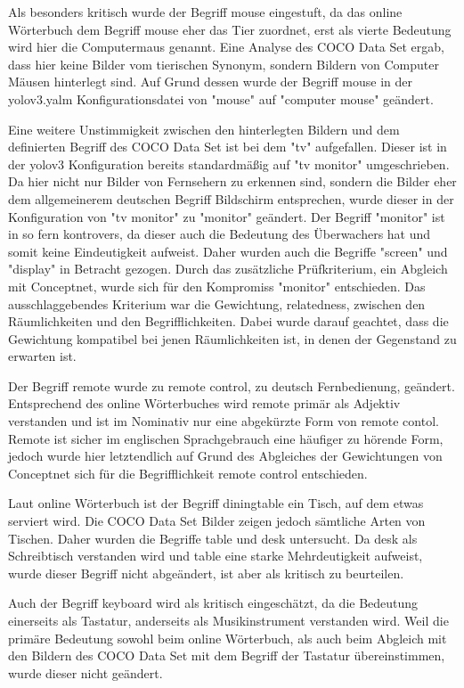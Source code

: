 Als besonders kritisch wurde der Begriff mouse eingestuft, da das online Wörterbuch dem Begriff mouse eher das Tier zuordnet, erst als vierte Bedeutung wird hier die Computermaus genannt.
Eine Analyse des COCO Data Set ergab, dass hier keine Bilder vom tierischen Synonym, sondern Bildern von Computer Mäusen hinterlegt sind.
Auf Grund dessen wurde der Begriff mouse in der yolov3.yalm Konfigurationsdatei von "mouse" auf "computer mouse" geändert. 


Eine weitere Unstimmigkeit zwischen den hinterlegten Bildern und dem definierten Begriff des COCO Data Set ist bei dem  "tv" aufgefallen. Dieser ist in der yolov3 Konfiguration bereits standardmäßig auf "tv monitor" umgeschrieben. Da hier nicht nur Bilder von Fernsehern zu erkennen sind, sondern die Bilder eher dem allgemeinerem deutschen Begriff Bildschirm entsprechen, wurde dieser in der Konfiguration von "tv monitor" zu "monitor" geändert. Der Begriff "monitor" ist in so fern kontrovers, da dieser auch die Bedeutung des Überwachers hat und somit keine Eindeutigkeit aufweist. Daher wurden auch die Begriffe "screen" und "display" in Betracht gezogen. Durch das zusätzliche Prüfkriterium, ein Abgleich mit Conceptnet, wurde sich für den Kompromiss "monitor" entschieden. Das ausschlaggebendes Kriterium war die Gewichtung, relatedness, zwischen den Räumlichkeiten und den Begrifflichkeiten. Dabei wurde darauf geachtet, dass die Gewichtung kompatibel bei jenen Räumlichkeiten ist, in denen der Gegenstand zu erwarten ist. 

Der Begriff remote wurde zu remote control, zu deutsch Fernbedienung, geändert. Entsprechend des online Wörterbuches wird remote primär als Adjektiv verstanden und ist im Nominativ nur eine abgekürzte Form von remote contol. Remote ist sicher im englischen Sprachgebrauch eine häufiger zu hörende Form, jedoch wurde hier letztendlich auf Grund des Abgleiches der Gewichtungen von Conceptnet sich für die Begrifflichkeit remote control entschieden.

Laut online Wörterbuch ist der Begriff diningtable ein Tisch, auf dem etwas serviert wird. Die COCO Data Set Bilder zeigen jedoch sämtliche Arten von Tischen. Daher wurden die Begriffe table und desk untersucht. Da desk als Schreibtisch verstanden wird und table eine starke Mehrdeutigkeit aufweist, wurde dieser Begriff nicht abgeändert, ist aber als kritisch zu beurteilen.


Auch der Begriff keyboard wird als kritisch eingeschätzt, da die Bedeutung einerseits als Tastatur, anderseits als Musikinstrument verstanden wird. Weil die primäre Bedeutung sowohl beim online Wörterbuch, als auch beim Abgleich mit den Bildern des COCO Data Set mit dem Begriff der Tastatur übereinstimmen, wurde dieser nicht geändert. 

